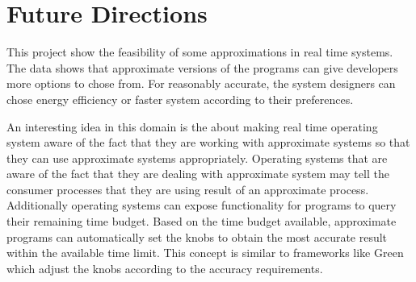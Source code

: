 \section{Future Directions}
This project show the feasibility of some approximations in real time systems. The data shows that approximate versions of the programs can give developers more options to chose from. For reasonably accurate, the system designers can chose energy efficiency or faster system according to their preferences.

An interesting idea in this domain is the about making real time operating system aware of the fact that they are working with approximate systems so that they can use approximate systems appropriately. Operating systems that are aware of the fact that they are dealing with approximate system may tell the consumer processes that they are using result of an approximate process. Additionally operating systems can expose functionality for programs to query their remaining time budget. Based on the time budget available, approximate programs can automatically set the knobs to obtain the most accurate result within the available time limit. This concept is similar to frameworks like Green \cite{Green} which adjust the knobs according to the accuracy requirements.

